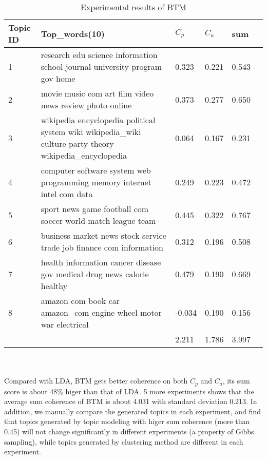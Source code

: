 \begin{table}[!htbp]
    \centering
    \hspace{0.5cm}
    \begin{tabular}{|p{45pt}|p{210pt}|p{30pt}|p{30pt}|p{30pt}|p{30pt}|}
        \hline
        Topic ID & Top\_words(10) & $C_p$ & $C_a$ & sum\\ \hline
        1 & research edu science information school journal university program gov home & 0.323 & 0.221 & 0.543\\\hline
        2 & movie music com art film video news review photo online & 0.373 & 0.277 & 0.650\\\hline
        3 & wikipedia encyclopedia political system wiki wikipedia\_wiki culture party theory wikipedia\_encyclopedia & 0.064 & 0.167 & 0.231\\\hline
        4 & computer software system web programming memory internet intel com data & 0.249 & 0.223 & 0.472\\\hline
        5 & sport news game football com soccer world match league team & 0.445 & 0.322 & 0.767\\\hline
        6 & business market news stock service trade job finance com information & 0.312 & 0.196 & 0.508\\\hline
        7 & health information cancer disease gov medical drug news calorie healthy & 0.479 & 0.190 & 0.669\\\hline
        8 & amazon com book car amazon\_com engine wheel motor war electrical & -0.034 & 0.190 & 0.156\\\hline
        & & 2.211 & 1.786 & 3.997\\\hline
    \end{tabular}
    \caption{Experimental results of BTM}
    \label{tab:BTM1}
\end{table}
\\\\Compared with LDA, BTM gets better coherence on both $C_p$ and $C_a$, its sum score is about 48\% higer than that of LDA. 5 more experiments shows that the average sum coherence of BTM is about 4.031 with standard deviation 0.213. In addition, we manually compare the generated topics in each experiment, and find that topics generated by topic modeling with higer sum coherence (more than 0.45) will not change significantly in different experiments (a property of Gibbs sampling), while topics generated by clustering method are different in each experiment. 

